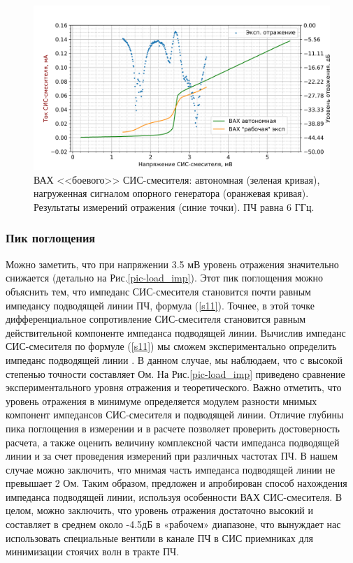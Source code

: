 \documentclass[a4paper]{article}
\begin{document}
\begin{figure}[H]
    \centering
    \includegraphics[scale=0.65]{refl2.png}
    \caption{ВАХ <<боевого>> СИС-смесителя: автономная (зеленая кривая), нагруженная сигналом опорного генератора (оранжевая кривая). Результаты измерений отражения (синие точки). ПЧ равна 6 ГГц.}
    \label{pic-refl2}
\end{figure}

\subsubsection{Пик поглощения}

Можно заметить, что при напряжении 3.5 мВ уровень отражения значительно снижается (детально на Рис.\ref{pic-load_imp}). Этот пик поглощения можно объяснить тем, что импеданс СИС-смесителя становится почти равным  импедансу подводящей линии ПЧ, формула (\ref{s11}). Точнее, в этой точке дифференциальное сопротивление СИС-смесителя становится равным действительной компоненте импеданса подводящей линии. Вычислив импеданс СИС-смесителя по формуле (\ref{s11}) мы сможем экспериментально определить импеданс подводящей линии . В данном случае, мы наблюдаем, что  с высокой степенью точности составляет  Ом. На Рис.\ref{pic-load_imp} приведено сравнение экспериментального уровня отражения и теоретического. Важно отметить, что уровень отражения в минимуме определяется модулем разности мнимых компонент импедансов СИС-смесителя и подводящей линии. Отличие глубины пика поглощения в измерении и в расчете позволяет проверить достоверность расчета, а также оценить величину комплексной части импеданса подводящей линии и за счет проведения измерений при различных частотах ПЧ. В нашем случае можно заключить, что мнимая часть импеданса подводящей линии не превышает 2 Ом. Таким образом, предложен и апробирован способ нахождения импеданса подводящей линии, используя особенности ВАХ СИС-смесителя.
В целом, можно заключить, что уровень отражения достаточно высокий и составляет в среднем около -4.5дБ в «рабочем» диапазоне, что вынуждает нас использовать специальные вентили в канале ПЧ в СИС приемниках для минимизации стоячих волн в тракте ПЧ.
\end{document}

